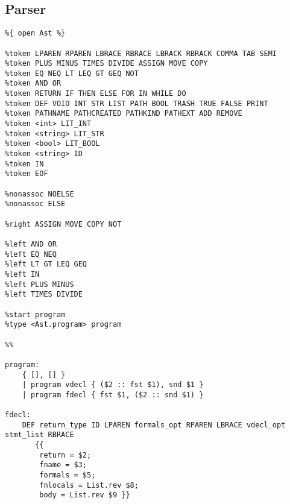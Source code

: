 \documentclass[11pt]{article}
\begin{document}
\newpage

\subsection{Parser} %
\label{sec:parser}

\begin{listing}[H]
  \begin{verbatim}
%{ open Ast %}

%token LPAREN RPAREN LBRACE RBRACE LBRACK RBRACK COMMA TAB SEMI
%token PLUS MINUS TIMES DIVIDE ASSIGN MOVE COPY
%token EQ NEQ LT LEQ GT GEQ NOT
%token AND OR
%token RETURN IF THEN ELSE FOR IN WHILE DO
%token DEF VOID INT STR LIST PATH BOOL TRASH TRUE FALSE PRINT
%token PATHNAME PATHCREATED PATHKIND PATHEXT ADD REMOVE
%token <int> LIT_INT
%token <string> LIT_STR
%token <bool> LIT_BOOL
%token <string> ID
%token IN
%token EOF

%nonassoc NOELSE
%nonassoc ELSE

%right ASSIGN MOVE COPY NOT

%left AND OR
%left EQ NEQ
%left LT GT LEQ GEQ
%left IN
%left PLUS MINUS
%left TIMES DIVIDE

%start program
%type <Ast.program> program

%%

program:
    { [], [] }
    | program vdecl { ($2 :: fst $1), snd $1 }
    | program fdecl { fst $1, ($2 :: snd $1) }

fdecl:
    DEF return_type ID LPAREN formals_opt RPAREN LBRACE vdecl_opt stmt_list RBRACE
       {{
        return = $2;
        fname = $3;
        formals = $5;
        fnlocals = List.rev $8;
        body = List.rev $9 }}
  \end{verbatim}
\end{listing}
\end{document}
